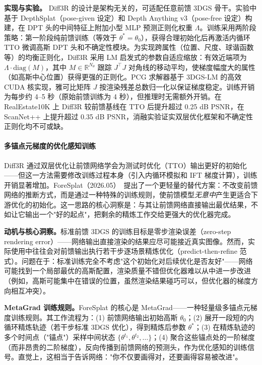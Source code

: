 \textbf{实现与实验。}
Diff3R 的设计是架构无关的，可适配任意前馈 3DGS 骨干。实验中基于 DepthSplat（pose-given 设定）和 Depth Anything v3（pose-free 设定）构建，在 DPT 头的中间特征上附加小型 MLP 预测正则化权重 $\Lambda$。训练采用两阶段策略：第一阶段纯前馈训练（等效于 $\theta^* = \theta_0$），获得合理初始化后再激活内循环 TTO 微调高斯 DPT 头和不确定性模块。为实现跨属性（位置、尺度、球谐函数等）的均衡正则化，Diff3R 采用 LM 启发式的参数自适应缩放：有效近端项为 $\Lambda \cdot \mathrm{diag}(M)$，其中 $M \in \mathbb{R}^{N_\theta}$ 跟踪 $J^\top J$ 对角线的移动平均，使梯度幅度大的属性（如高斯中心位置）获得更强的正则化。PCG 求解器基于 3DGS-LM 的高效 CUDA 核实现，雅可比矩阵 $J$ 按渲染残差总数归一化以保证梯度稳定。训练开销为每步约 4--5 秒（原始前馈训练为 4 秒），但推理时无需额外开销。在 RealEstate10K 上 Diff3R 较前馈基线在 TTO 后提升超过 0.25 dB PSNR，在 ScanNet++ 上提升超过 0.35 dB PSNR，消融实验证实双层优化框架和不确定性正则化均不可或缺。

\paragraph{多锚点元梯度的优化感知训练}

Diff3R 通过双层优化让前馈网络学会为测试时优化（TTO）输出更好的初始化——但这一方法需要修改训练过程本身（引入内循环模拟和 IFT 梯度计算），训练开销显著增加。ForeSplat（2026.05）~\cite{2605_22020}提出了一个更轻量的替代方案：不改变前馈网络的推断方式，而是通过一种特殊的训练规则，使前馈模型\emph{无意中}产生更适合下游优化的初始化。这一思路的核心洞察是：与其让前馈网络直接输出最优结果，不如让它输出一个"好的起点"，把剩余的精炼工作交给更强大的优化器完成。

\textbf{动机与核心洞察。}标准前馈 3DGS 的训练目标是零步渲染误差（zero-step rendering error）——网络输出直接渲染的结果应尽可能接近真实图像。然而，实际使用中往往会对前馈输出执行若干步逐场景精炼优化（predict-then-refine 范式）。问题在于：标准训练完全不考虑"这个初始化对后续优化是否友好"——网络可能找到一个局部最优的高斯配置，渲染质量不错但优化器难以从中进一步改进（例如，高斯可能集中在错误的位置，虽然渲染结果碰巧可以，但优化器的梯度方向相互冲突）。

\textbf{MetaGrad 训练规则。}ForeSplat 的核心是 MetaGrad——一种轻量级多锚点元梯度训练规则。其工作流程为：(1) 前馈网络输出初始高斯 $\theta_0$；(2) 展开一段短的内循环精炼轨迹（若干步标准 3DGS 优化），得到精炼后参数 $\theta^*$；(3) 在精炼轨迹的多个时间点（"锚点"）采样中间状态 $\{\theta^{t_1}, \theta^{t_2}, \ldots\}$；(4) 聚合这些锚点处的一阶梯度（而非昂贵的二阶梯度），反向传播到前馈网络的预测头，作为优化感知的训练信号。直觉上，这相当于告诉网络："你不仅要画得对，还要画得容易被改进"。

